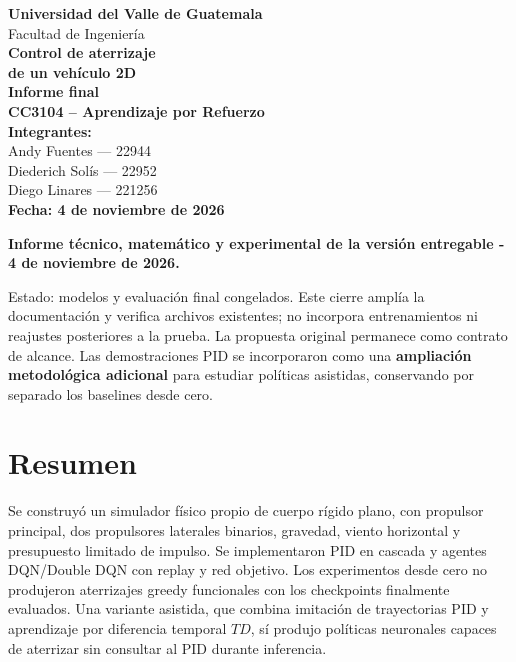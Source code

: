 \documentclass[12pt,a4paper]{article}
\begin{document}
\hypersetup{pageanchor=false}
\begin{titlepage}
  \centering
  \vspace*{2cm}
  {\LARGE\textbf{Universidad del Valle de Guatemala}}\\[0.5cm]
  {\Large Facultad de Ingeniería}\\[1.5cm]
  {\Huge\textbf{Control de aterrizaje\\ de un vehículo 2D}}\\[0.5cm]
  {\Large\textbf{Informe final}}\\[0.4cm]
  {\Large\textbf{CC3104 -- Aprendizaje por Refuerzo}}\\[2cm]
  \textbf{Integrantes:}\\[0.3cm]
  Andy Fuentes --- 22944\\
  Diederich Solís --- 22952\\
  Diego Linares --- 221256\\[2cm]
  \textbf{Fecha: 4 de noviembre de 2026}
  \vfill
\end{titlepage}
\hypersetup{pageanchor=true}
\tableofcontents
\clearpage
\textbf{Informe técnico,\allowbreak{} matemático y experimental de la versión entregable - 4 de noviembre de 2026.}


Estado: modelos y evaluación final congelados. Este cierre amplía la documentación y verifica archivos existentes; no incorpora entrenamientos ni reajustes posteriores a la prueba. La propuesta original permanece como contrato de alcance. Las demostraciones PID se incorporaron como una \textbf{ampliación metodológica adicional} para estudiar políticas asistidas,\allowbreak{} conservando por separado los baselines desde cero.



\section{Resumen}
Se construyó un simulador físico propio de cuerpo rígido plano,\allowbreak{} con propulsor principal,\allowbreak{} dos propulsores laterales binarios,\allowbreak{} gravedad,\allowbreak{} viento horizontal y presupuesto limitado de impulso. Se implementaron PID en cascada y agentes DQN/\allowbreak{}Double DQN con replay y red objetivo. Los experimentos desde cero no produjeron aterrizajes greedy funcionales con los checkpoints finalmente evaluados. Una variante asistida,\allowbreak{} que combina imitación de trayectorias PID y aprendizaje por diferencia temporal $TD$,\allowbreak{} sí produjo políticas neuronales capaces de aterrizar sin consultar al PID durante inferencia.
\end{document}
